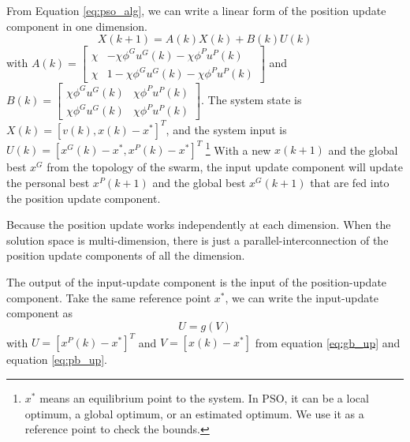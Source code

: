 From Equation \eqref{eq:pso_alg}, we can write a linear form of the position update component in one dimension.
\begin{equation}
\label{eq:pso_up_linalg_simp}
X(k+1) = A(k) X(k) + B(k) U(k)
\end{equation}
with
$ A(k) = \begin{bmatrix}
\chi & - \chi \phi^{G} u^{G}(k) - \chi \phi^{P} u^{P}(k)
\\ 
\chi & 1 - \chi \phi^{G} u^{G}(k) - \chi \phi^{P} u^{P}(k)
\end{bmatrix} $
and
$ B(k) = \begin{bmatrix}
\chi \phi^{G} u^{G}(k) & \chi \phi^{P} u^{P}(k)
\\ 
\chi \phi^{G} u^{G}(k) & \chi \phi^{P} u^{P}(k)
\end{bmatrix} $.
The system state is $ X(k) = [ v(k), x(k) - x^{*} ]^{T} $, and the system input is $ U(k) = [ x^{G}(k) - x^{*} , x^{P}(k) - x^{*} ]^{T} $
\footnote{$ x^{*} $ means an equilibrium point to the system.
In PSO, it can be a local optimum, a global optimum, or an estimated optimum.
We use it as a reference point to check the bounds.}
With a new $ x(k+1) $ and the global best $ x^{G} $ from the topology of the swarm, the input update component will update the personal best $ x^{P}(k+1) $ and the global best $ x^{G}(k+1) $ that are fed into the position update component.

Because the position update works independently at each dimension.
When the solution space is multi-dimension, there is just a parallel-interconnection of the position update components of all the dimension.

The output of the input-update component is the input of the position-update component.
Take the same reference point $ x^{*} $, we can write the input-update component as 
\begin{equation}
\label{eq:pso_input_up}
U = g(V)
\end{equation}
with $ U = [ x^{P}(k) - x^{*} ]^{T} $ 
and $ V = [ x(k) - x^{*} ] $
from equation \eqref{eq:gb_up} and equation \eqref{eq:pb_up}. 

